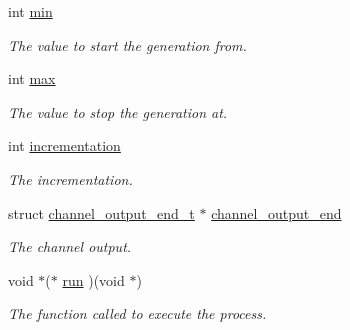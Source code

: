 \begin{DoxyCompactItemize}
\item 
\hypertarget{structnumber__generator__process_aafc57424c6c4c542b637318b0eb1ed37}{int \hyperlink{structnumber__generator__process_aafc57424c6c4c542b637318b0eb1ed37}{min}}\label{structnumber__generator__process_aafc57424c6c4c542b637318b0eb1ed37}

\begin{DoxyCompactList}\small\item\em The value to start the generation from. \end{DoxyCompactList}\item 
\hypertarget{structnumber__generator__process_a31cde720224a169bb71d8b7aa71517e0}{int \hyperlink{structnumber__generator__process_a31cde720224a169bb71d8b7aa71517e0}{max}}\label{structnumber__generator__process_a31cde720224a169bb71d8b7aa71517e0}

\begin{DoxyCompactList}\small\item\em The value to stop the generation at. \end{DoxyCompactList}\item 
\hypertarget{structnumber__generator__process_a48a813128ef9107d2f9b1985cfb8e7d2}{int \hyperlink{structnumber__generator__process_a48a813128ef9107d2f9b1985cfb8e7d2}{incrementation}}\label{structnumber__generator__process_a48a813128ef9107d2f9b1985cfb8e7d2}

\begin{DoxyCompactList}\small\item\em The incrementation. \end{DoxyCompactList}\item 
\hypertarget{structnumber__generator__process_ac47be8ddb997f0a59f18e9e4f254def0}{struct \hyperlink{structchannel__output__end__t}{channel\-\_\-output\-\_\-end\-\_\-t} $\ast$ \hyperlink{structnumber__generator__process_ac47be8ddb997f0a59f18e9e4f254def0}{channel\-\_\-output\-\_\-end}}\label{structnumber__generator__process_ac47be8ddb997f0a59f18e9e4f254def0}

\begin{DoxyCompactList}\small\item\em The channel output. \end{DoxyCompactList}\item 
\hypertarget{structnumber__generator__process_ab4d4b70ec9824a62d2fe4822a61e3c91}{void $\ast$($\ast$ \hyperlink{structnumber__generator__process_ab4d4b70ec9824a62d2fe4822a61e3c91}{run} )(void $\ast$)}\label{structnumber__generator__process_ab4d4b70ec9824a62d2fe4822a61e3c91}

\begin{DoxyCompactList}\small\item\em The function called to execute the process. \end{DoxyCompactList}\end{DoxyCompactItemize}


